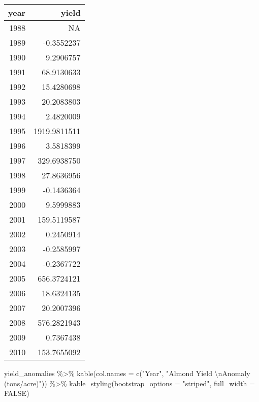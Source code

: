\documentclass[
]{article}
\newenvironment{Shaded}{\begin{snugshade}}{\end{snugshade}}
\newcommand{\AttributeTok}[1]{\textcolor[rgb]{0.77,0.63,0.00}{#1}}
\newcommand{\ConstantTok}[1]{\textcolor[rgb]{0.00,0.00,0.00}{#1}}
\newcommand{\FunctionTok}[1]{\textcolor[rgb]{0.00,0.00,0.00}{#1}}
\newcommand{\NormalTok}[1]{#1}
\newcommand{\SpecialCharTok}[1]{\textcolor[rgb]{0.00,0.00,0.00}{#1}}
\newcommand{\StringTok}[1]{\textcolor[rgb]{0.31,0.60,0.02}{#1}}
\begin{document}
\begin{tabular}{r|r}
\hline
year & yield\\
\hline
1988 & NA\\
\hline
1989 & -0.3552237\\
\hline
1990 & 9.2906757\\
\hline
1991 & 68.9130633\\
\hline
1992 & 15.4280698\\
\hline
1993 & 20.2083803\\
\hline
1994 & 2.4820009\\
\hline
1995 & 1919.9811511\\
\hline
1996 & 3.5818399\\
\hline
1997 & 329.6938750\\
\hline
1998 & 27.8636956\\
\hline
1999 & -0.1436364\\
\hline
2000 & 9.5999883\\
\hline
2001 & 159.5119587\\
\hline
2002 & 0.2450914\\
\hline
2003 & -0.2585997\\
\hline
2004 & -0.2367722\\
\hline
2005 & 656.3724121\\
\hline
2006 & 18.6324135\\
\hline
2007 & 20.2007396\\
\hline
2008 & 576.2821943\\
\hline
2009 & 0.7367438\\
\hline
2010 & 153.7655092\\
\hline
\end{tabular}

\begin{Shaded}
\begin{Highlighting}[]
\NormalTok{yield\_anomalies }\SpecialCharTok{\%\textgreater{}\%} \FunctionTok{kable}\NormalTok{(}\AttributeTok{col.names =} \FunctionTok{c}\NormalTok{(}\StringTok{"Year"}\NormalTok{,}
                                        \StringTok{"Almond Yield }\SpecialCharTok{\textbackslash{}n}\StringTok{Anomaly (tons/acre)"}\NormalTok{)) }\SpecialCharTok{\%\textgreater{}\%} 
  \FunctionTok{kable\_styling}\NormalTok{(}\AttributeTok{bootstrap\_options =} \StringTok{"striped"}\NormalTok{,}
                \AttributeTok{full\_width =} \ConstantTok{FALSE}\NormalTok{)}
\end{Highlighting}
\end{Shaded}
\end{document}
